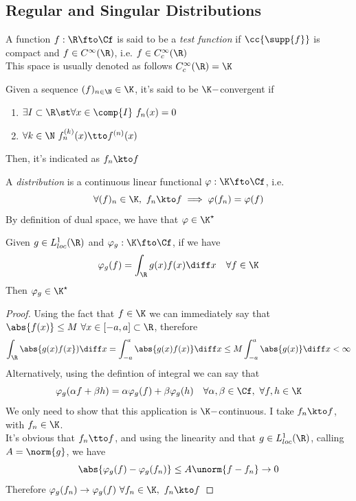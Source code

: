 \documentclass[../mmf.tex]{subfiles}
\begin{document}
\subsection{Regular and Singular Distributions}
\begin{dfn}
	A function $f:\R\fto\Cf$ is said to be a \textit{test function} if $\cc{\supp\{f\}}$ is compact and $f\in C^\infty(\R)$, i.e. $f\in C_c^\infty(\R)$\\
	This space is usually denoted as follows $C^\infty_c(\R)=\K$
\end{dfn}
\begin{dfn}[$\K$-convergence]
	Given a sequence $(f)_{n\in\N}\in\K$, it's said to be $\K-$convergent if
	\begin{enumerate}
	\item $\exists I\subset\R\st\forall x\in\comp{I}\ f_n(x)=0$
	\item $\forall k\in\N\ f^{(k)}_n(x)\tto f^{(n)}(x) $
	\end{enumerate}
	Then, it's indicated as $f_n\kto f$
\end{dfn}
\begin{dfn}[Distribution]
	A \textit{distribution} is  a continuous linear functional $\varphi:\K\fto\Cf$, i.e.
	\begin{equation*}
		\forall(f)_n\in\K,\ f_n\kto f\implies{}\varphi(f_n)=\varphi(f)
	\end{equation*}
	By definition of dual space, we have that $\varphi\in\K^\star$
\end{dfn}
\begin{thm}
	Given $g\in L^1_{loc}(\R)$ and $\varphi_g:\K\fto\Cf$, if we have
	\begin{equation*}
		\varphi_g(f)=\int_{\R}^{}g(x)f(x)\diff x\quad\forall f\in\K
	\end{equation*}
	Then $\varphi_g\in\K^\star$
\end{thm}
\begin{proof}
	Using the fact that $f\in\K$ we can immediately say that $\abs{f(x)}\le M\ \forall x\in[-a,a]\subset\R$, therefore
	\begin{equation*}
		\int_{\R}^{}\abs{g(x)f(x})\diff x=\int_{-a}^{a}\abs{g(x)f(x)}\diff x\le M\int_{-a}^{a}\abs{g(x)}\diff x<\infty
	\end{equation*}
	Alternatively, using the defintion of integral we can say that
	\begin{equation*}
		\varphi_g(\alpha f+\beta h)=\alpha\varphi_g(f)+\beta\varphi_g(h)\quad\forall\alpha,\beta\in\Cf,\ \forall f,h\in\K
	\end{equation*}
	We only need to show that this application is $\K-$continuous. I take $f_n\kto f$, with $f_n\in\K$.\\
	It's obvious that $f_n\tto f$, and using the linearity and that $g\in L^1_{loc}(\R)$, calling $A=\norm{g}$, we have
	\begin{equation*}
		\abs{\varphi_g(f)-\varphi_g(f_n)}\le A\unorm{f-f_n}\to0
	\end{equation*}
	Therefore $\varphi_g(f_n)\to\varphi_g(f)\ \forall f_n\in\K,\ f_n\kto f$
\end{proof}
\end{document}
